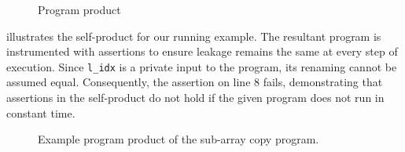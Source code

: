 \begin{figure}[h]
    \centering
    \label{fig:fig_7}
    \label{fig:fig_8}
    \caption{Program product}
    \label{fig:rules}
\end{figure}

 illustrates the self-product for our running example. 
The resultant program is instrumented with assertions to ensure leakage remains the same at
every step of execution.
Since \texttt{l\_idx} is a private input to the program, its renaming cannot be assumed equal.
Consequently, the assertion on line $8$ fails, demonstrating that assertions in the self-product do not hold if the given program does not run in constant time.

\begin{figure}[h]
    \centering\resizebox{0.9\columnwidth}{!}{}
    \caption{Example program product of the sub-array copy program.}
    \label{fig:example_prod}
\end{figure}